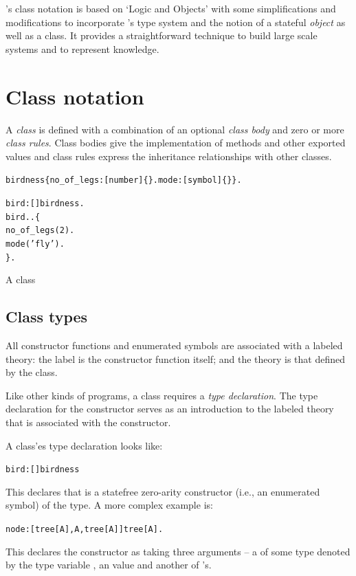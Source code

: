 \go's class notation is based on `Logic and Objects' \cite{fgm:92} with some simplifications and modifications to incorporate \go's type system and the notion of a stateful \emph{object} as well as a class. It provides a straightforward technique to build large scale systems and to represent knowledge. 

\section{Class notation}
\label{objects:class}
A \go \emph{class} is defined with a combination of an optional \emph{class body} and zero or more \emph{class rules}. Class bodies give the implementation of methods and other exported values and class rules express the inheritance relationships with other classes.

\begin{program}
\vspace{0.5ex}
\begin{alltt}
birdness \impl \{ no_of_legs:[number]\{\}. mode:[symbol]\{\} \}.

bird:[]\conarrow{}birdness.
bird..\{
  no_of_legs(2).
  mode('fly').
\}.
\end{alltt}
\vspace{-2ex}
\caption{A  class}
\label{lo:bird}
\end{program}

\subsection{Class types}
\label{lo:classtype}

All constructor functions and enumerated symbols are associated with a labeled theory: the label is the constructor function itself; and the theory is that defined by the class.

Like other kinds of programs, a class requires a \emph{type declaration}. The type declaration for the constructor serves as an introduction to the labeled theory that is associated with the constructor. 

A class'es type declaration looks like:
\begin{alltt}
bird:[] \conarrow birdness
\end{alltt}
This declares that  is a statefree zero-arity constructor (i.e., an enumerated symbol) of the  type. A more complex example is:
\begin{alltt}
node:[tree[A],A,tree[A]] \conarrow tree[A].
\end{alltt}
This declares the  constructor as taking three arguments -- a  of some type denoted by the type variable , an  value and another  of 's.

